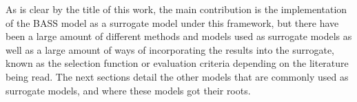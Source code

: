 As is clear by the title of this work, the main contribution is the implementation of the BASS model as a surrogate model under this framework, but there have been a large amount of different methods and models used as surrogate models as well as a large amount of ways of incorporating the results into the surrogate, known as the selection function or evaluation criteria depending on the literature being read. The next sections detail the other models that are commonly used as surrogate models, and where these models got their roots.


